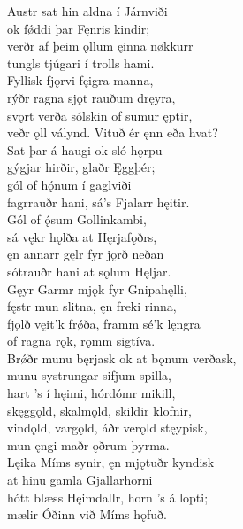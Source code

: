 \bva Austr sat hin aldna \hld í Járnviði \\%
ok fǿddi þar \hld Fęnris kindir; \\%
verðr af þeim ǫllum \hld ęinna nøkkurr \\%
tungls tjúgari \hld í trolls hami.\\%

\bva Fyllisk fjǫrvi \hld fęigra manna, \\%
rýðr ragna sjǫt \hld rauðum dręyra, \\%
svǫrt verða sólskin \hld of sumur ęptir, \\%
veðr ǫll válynd. \hld Vituð ér ęnn eða hvat?\\%

\bva Sat þar á haugi \hld ok sló hǫrpu \\%
gýgjar hirðir, \hld glaðr Ęggþér; \\%
gól of hǫ́num \hld í gaglviði \\%
fagrrauðr hani, \hld sá's Fjalarr hęitir.\\%

\bva Gól of ǫ́sum \hld Gollinkambi, \\%
sá vękr hǫlða \hld at Hęrjafǫðrs, \\%
ęn annarr gęlr \hld fyr jǫrð neðan \\%
sótrauðr hani \hld at sǫlum Hęljar.\\%

\bva Gęyr Garmr mjǫk \hld fyr Gnipahęlli, \\%
fęstr mun slitna, \hld ęn freki rinna, \\%
fjǫlð vęit'k frǿða, \hld framm sé'k lęngra \\%
of ragna rǫk, \hld rǫmm sigtíva.\\%

\bva Brǿðr munu bęrjask \hld ok at bǫnum verðask, \\%
munu systrungar \hld sifjum spilla, \\%
hart ’s í hęimi, \hld hórdómr mikill, \\%
skęggǫld, skalmǫld, \hld skildir klofnir, \\%
vindǫld, vargǫld, \hld áðr verǫld stęypisk,\footnotemark[1] \\%
mun ęngi maðr \hld ǫðrum þyrma.
\\%

\bva Lęika Míms synir, \hld ęn mjǫtuðr kyndisk \\%
at hinu gamla \hld Gjallarhorni \\%
hótt blæss Hęimdallr, \hld horn ’s á lopti; \\%
mælir Óðinn \hld við Míms hǫfuð.\\%

